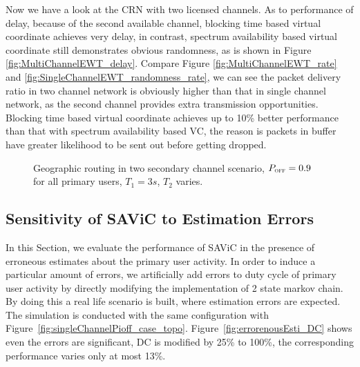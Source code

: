 Now we have a look at the CRN with two licensed channels.
As to performance of delay, because of the second available channel, blocking time based virtual coordinate achieves very delay, in contrast, spectrum availability based virtual coordinate still demonstrates obvious randomness, as is shown in Figure \ref{fig:MultiChannelEWT_delay}. 
Compare Figure \ref{fig:MultiChannelEWT_rate} and \ref{fig:SingleChannelEWT_randomness_rate}, we can see the packet delivery ratio in two channel network is obviously higher than that in single channel network, as the second channel provides extra transmission opportunities.
Blocking time based virtual coordinate achieves up to 10\% better performance than that with spectrum availability based VC, the reason is packets in buffer have greater likelihood to be sent out before getting dropped.
\begin{figure}[htb!]
\label{fig:MultiChannelEWT_pdr}
\caption{Geographic routing in two secondary channel scenario, $P_{\textsc{\tiny OFF}}=0.9$ for all primary users, $T_1=3s$, $T_2$ varies.}
\end{figure}

\subsection{Sensitivity of SAViC to Estimation Errors}
In this Section, we evaluate the performance of SAViC in the presence of erroneous estimates about the primary user activity.
In order to induce a particular amount of errors, we artificially add errors to duty cycle of primary user activity by directly modifying the implementation of 2 state markov chain. 
By doing this a real life scenario is built, where estimation errors are expected.
The simulation is conducted with the same configuration with Figure~\ref{fig:singleChannelPioff_case_topo}.
Figure~\ref{fig:errorenousEsti_DC} shows even the errors are significant, \ie DC is modified by 25\% to 100\%, the corresponding performance varies only at most 13\%.


